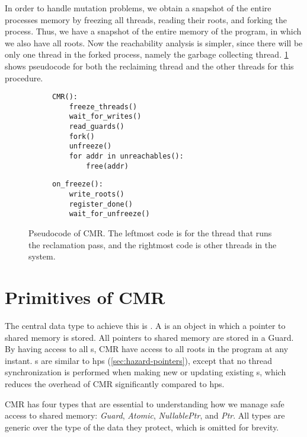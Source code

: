 In order to handle mutation problems, we obtain a snapshot of the entire processes memory by
freezing all threads, reading their roots, and forking the process. Thus, we have a snapshot of
the entire memory of the program, in which we also have all roots. Now the reachability analysis is
simpler, since there will be only one thread in the forked process, namely the garbage collecting
thread. \cref{lst:cmr} shows pseudocode for both the reclaiming thread and the other threads
for this procedure.

\begin{figure}[ht]
  \begin{subfigure}{0.45\textwidth}
    \begin{lstlisting}
CMR():
    freeze_threads()
    wait_for_writes()
    read_guards()
    fork()
    unfreeze()
    for addr in unreachables():
        free(addr)\end{lstlisting}
  \end{subfigure}
  \hfill
  \begin{subfigure}{0.45\textwidth}
    \begin{lstlisting}
on_freeze():
    write_roots()
    register_done()
    wait_for_unfreeze()\end{lstlisting}
  \end{subfigure}
  \caption{Pseudocode of CMR\@. The leftmost code is for the thread that runs the reclamation pass,
  and the rightmost code is other threads in the system.\label{lst:cmr}}
\end{figure}



\section{Primitives of CMR\label{sec:cmr-primitives}}

The central data type to achieve this is . A  is an object in which a
pointer to shared memory is stored. All pointers to shared memory are stored in a Guard. By having
access to all s, CMR have access to all roots in the program at any instant.
s are similar to \gls{hps} (\cref{sec:hazard-pointers}), except that no thread
synchronization is performed when making new or updating existing s, which reduces the
overhead of CMR significantly compared to \gls{hps}.

CMR has four types that are essential to understanding how we manage safe access to shared memory:
\emph{Guard}, \emph{Atomic}, \emph{NullablePtr}, and \emph{Ptr}. All types are generic over the
type of the data they protect, which is omitted for brevity.


